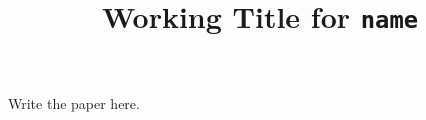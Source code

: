 \documentclass{article}
\title{Working Title for \texttt{{{name}}}}
\begin{document}
\maketitle
Write the paper here.
\end{document}
